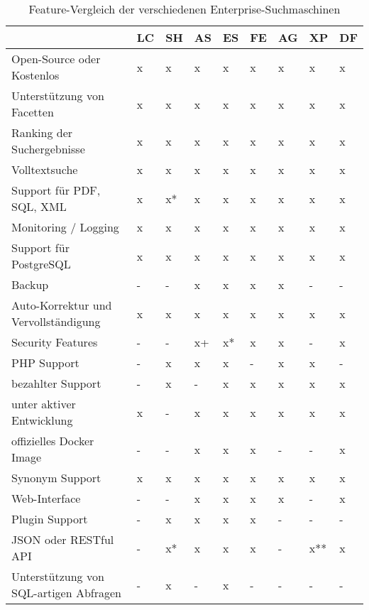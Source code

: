 \begin{table}[hbtp]
	\centering
		\begin{tabular}{l | l | l | l | l | l | l | l | l}
		& \textbf{LC} & \textbf{SH} & \textbf{AS} & \textbf{ES}  & \textbf{FE} & \textbf{AG} & \textbf{XP} & \textbf{DF} \\
        \hline
        Open-Source oder Kostenlos                  & x & x  & x & x  & x & x  & x & x \\
        Unterstützung von Facetten                  & x & x  & x & x  & x & x  & x & x \\
        Ranking der Suchergebnisse                  & x & x  & x & x  & x & x  & x & x \\
        Volltextsuche                               & x & x  & x & x  & x & x  & x & x \\
        Support für PDF, SQL, XML                   & x & x* & x & x  & x & x  & x & x \\
        Monitoring / Logging                        & x & x  & x & x  & x & x  & x & x \\
        \hline
        Support für PostgreSQL                      & x & x  & x  & x  & x & x  & x & x \\
        Backup                                      & - & -  & x  & x  & x & x & - & - \\
        Auto-Korrektur und Vervollständigung        & x & x  & x  & x  & x & x  & x & x \\
        Security Features                           & - & -  & x+ & x* & x & x  & - & x \\
        PHP Support                                 & - & x  & x  & x  & - & x  & x & - \\
        bezahlter Support                           & - & x  & -  & x  & x & x  & x & x \\
        \hline
        unter aktiver Entwicklung                   & x & -  & x  & x  & x & x  & x & x \\
        offizielles Docker Image                    & - & -  & x  & x  & x & -  & - & x \\
        Synonym Support                             & x & x  & x  & x  & x & x  & x & x \\
        Web-Interface                               & - & -  & x  & x  & x & x  & - & x \\
        Plugin Support                              & - & x  & x  & x  & x & -  & - & - \\
        JSON oder RESTful API                       & - & x* & x  & x  & x & -  & x** & x \\
        Unterstützung von SQL-artigen Abfragen      & - & x  & -  & x  & - & -  & - & - \\
		\end{tabular}
    \caption{Feature-Vergleich der verschiedenen Enterprise-Suchmaschinen }
    \label{vglTable}


\end{table}
